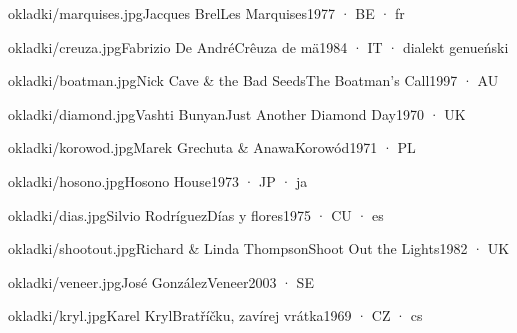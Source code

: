 \documentclass[10pt,twoside]{article}
\begin{document}
\begin{album}{okladki/marquises.jpg}{Jacques Brel}{Les Marquises}{1977 · BE · fr}
\lipsum[15][1-3]
\end{album}

\begin{album}{okladki/creuza.jpg}{Fabrizio De André}{Crêuza de mä}{1984 · IT · dialekt genueński}
\lipsum[16][1-3]
\end{album}

\begin{album}{okladki/boatman.jpg}{Nick Cave \& the Bad Seeds}{The Boatman's Call}{1997 · AU}
\lipsum[17][1-3]
\end{album}

\lipsum[18]

\begin{album}{okladki/diamond.jpg}{Vashti Bunyan}{Just Another Diamond Day}{1970 · UK}
\lipsum[19][1-3]
\end{album}

\begin{album}{okladki/korowod.jpg}{Marek Grechuta \& Anawa}{Korowód}{1971 · PL}
\lipsum[20][1-3]
\end{album}

\begin{album}{okladki/hosono.jpg}{}{Hosono House}{1973 · JP · ja}
\lipsum[21][1-3]
\end{album}

\begin{album}{okladki/dias.jpg}{Silvio Rodríguez}{Días y flores}{1975 · CU · es}
\lipsum[22][1-3]
\end{album}

\begin{album}{okladki/shootout.jpg}{Richard \& Linda Thompson}{Shoot Out the Lights}{1982 · UK}
\lipsum[23][1-3]
\end{album}

\begin{album}{okladki/veneer.jpg}{José González}{Veneer}{2003 · SE}
\lipsum[24][1-3]
\end{album}

\lipsum[25]

\begin{album}{okladki/kryl.jpg}{Karel Kryl}{Bratříčku, zavírej vrátka}{1969 · CZ · cs}
\lipsum[26][1-3]
\end{album}
\end{document}
